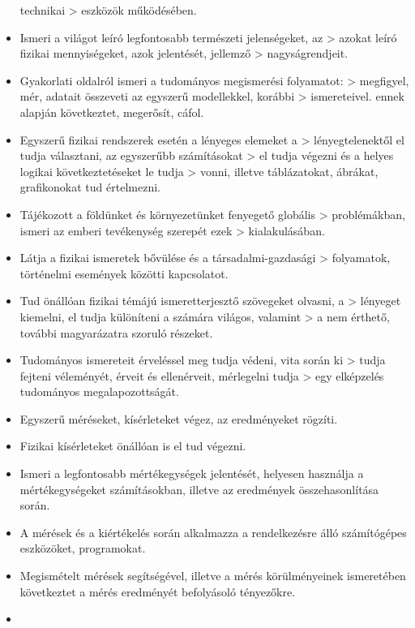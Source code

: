 \begin{itemize}
  technikai \textgreater{} eszközök működésében.
\item
  Ismeri a világot leíró legfontosabb természeti jelenségeket, az
  \textgreater{} azokat leíró fizikai mennyiségeket, azok jelentését,
  jellemző \textgreater{} nagyságrendjeit.
\item
  Gyakorlati oldalról ismeri a tudományos megismerési folyamatot:
  \textgreater{} megfigyel, mér, adatait összeveti az egyszerű
  modellekkel, korábbi \textgreater{} ismereteivel. ennek alapján
  következtet, megerősít, cáfol.
\item
  Egyszerű fizikai rendszerek esetén a lényeges elemeket a
  \textgreater{} lényegtelenektől el tudja választani, az egyszerűbb
  számításokat \textgreater{} el tudja végezni és a helyes logikai
  következtetéseket le tudja \textgreater{} vonni, illetve táblázatokat,
  ábrákat, grafikonokat tud értelmezni.
\item
  Tájékozott a földünket és környezetünket fenyegető globális
  \textgreater{} problémákban, ismeri az emberi tevékenység szerepét
  ezek \textgreater{} kialakulásában.
\item
  Látja a fizikai ismeretek bővülése és a társadalmi-gazdasági
  \textgreater{} folyamatok, történelmi események közötti kapcsolatot.
\item
  Tud önállóan fizikai témájú ismeretterjesztő szövegeket olvasni, a
  \textgreater{} lényeget kiemelni, el tudja különíteni a számára
  világos, valamint \textgreater{} a nem érthető, további magyarázatra
  szoruló részeket.
\item
  Tudományos ismereteit érveléssel meg tudja védeni, vita során ki
  \textgreater{} tudja fejteni véleményét, érveit és ellenérveit,
  mérlegelni tudja \textgreater{} egy elképzelés tudományos
  megalapozottságát.
\item
  Egyszerű méréseket, kísérleteket végez, az eredményeket rögzíti.
\item
  Fizikai kísérleteket önállóan is el tud végezni.
\item
  Ismeri a legfontosabb mértékegységek jelentését, helyesen használja a
  mértékegységeket számításokban, illetve az eredmények összehasonlítása
  során.
\item
  A mérések és a kiértékelés során alkalmazza a rendelkezésre álló
  számítógépes eszközöket, programokat.
\item
  Megismételt mérések segítségével, illetve a mérés körülményeinek
  ismeretében következtet a mérés eredményét befolyásoló tényezőkre.
\item

\end{itemize}
